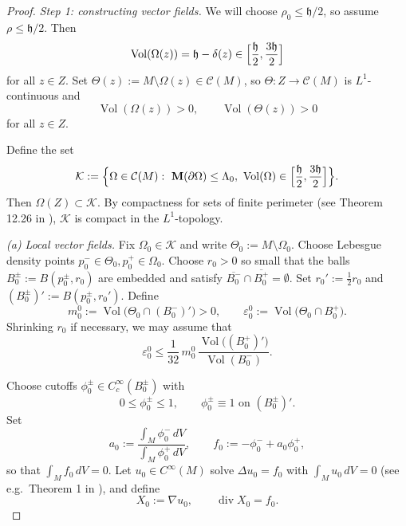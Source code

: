 \documentclass[12pt,english]{article}
\theoremstyle{definition}
\begin{document}
\begin{proof}
\noindent\emph{Step 1: constructing vector fields.}
We will choose $\rho_0\le \mathfrak h/2$, so assume $\rho\le \mathfrak h/2$. Then
\[
\operatorname{Vol}(\Omega(z))=\mathfrak h-\delta(z)\in\Bigl[\frac{\mathfrak h}{2},\frac{3\mathfrak h}{2}\Bigr]
\]
for all $z\in Z$.
Set $\Theta(z):=M\setminus\Omega(z)\in\mathcal C(M)$, so $\Theta:Z\to\mathcal C(M)$ is $L^1$-continuous and
\[
\operatorname{Vol}(\Omega(z))>0,\qquad \operatorname{Vol}(\Theta(z))>0
\]
for all $z\in Z$.

Define the set
\[
\mathcal K:=\Bigl\{\Omega\in\mathcal C(M):\ \mathbf M(\partial\Omega)\le \Lambda_0,\ 
\operatorname{Vol}(\Omega)\in\Bigl[\frac{\mathfrak h}{2},\frac{3\mathfrak h}{2}\Bigr]\Bigr\}.
\]
Then $\Omega(Z)\subset\mathcal K$. By compactness for sets of finite perimeter (see Theorem 12.26 in \cite{Maggi}), $\mathcal K$ is compact in the $L^1$-topology.

\smallskip
\noindent\emph{(a) Local vector fields.}
Fix $\Omega_0\in\mathcal K$ and write $\Theta_0:=M\setminus\Omega_0$.
Choose Lebesgue density points $p_0^-\in \Theta_0, p_0^+\in \Omega_0$. Choose $r_0>0$ so small that the balls $B_0^\pm:=B(p_0^\pm,r_0)$ are embedded and satisfy $\overline{B_0^-}\cap \overline{B_0^+}=\emptyset$.
Set $r_0':=\frac12 r_0$ and $(B_0^\pm)':=B(p_0^\pm,r_0')$.
Define
\[
m_0^0:=\operatorname{Vol}\bigl(\Theta_0\cap (B_0^-)'\bigr)>0,
\qquad
\varepsilon_0^0:=\operatorname{Vol}\bigl(\Theta_0\cap B_0^+\bigr).
\]
Shrinking $r_0$ if necessary, we may assume that
\begin{equation}\label{eq:local_plus_small_balanced}
\varepsilon_0^0\le \frac{1}{32}\,m_0^0\,\frac{\operatorname{Vol}\bigl((B_0^+)'\bigr)}{\operatorname{Vol}(B_0^-)}.
\end{equation}

Choose cutoffs $\phi_0^\pm\in C^\infty_c(B_0^\pm)$ with
\[
0\le \phi_0^\pm\le 1,\qquad \phi_0^\pm\equiv 1 \text{ on } (B_0^\pm)'.
\]
Set
\[
a_0:=\frac{\int_M \phi_0^-\,dV}{\int_M \phi_0^+\,dV},
\qquad
f_0:=-\phi_0^-+a_0\phi_0^+,
\]
so that $\int_M f_0\,dV=0$. Let $u_0\in C^\infty(M)$ solve $\Delta u_0=f_0$ with $\int_M u_0\,dV=0$
(see e.g.\ Theorem 1 in \cite{Donaldson}), and define
\[
X_0:=\nabla u_0,\qquad \operatorname{div} X_0=f_0.
\]


\end{proof}
\end{document}
